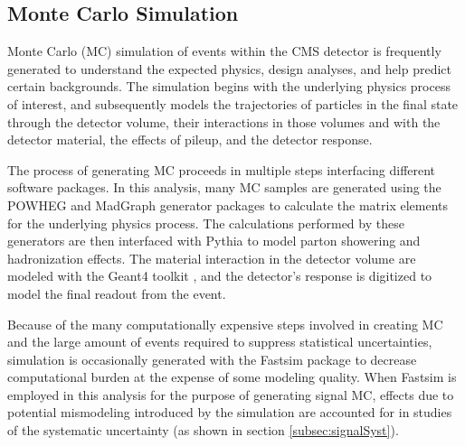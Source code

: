 \subsection{Monte Carlo Simulation}
\label{subsec:simulation}

Monte Carlo (MC) simulation of events within the CMS detector is frequently generated to understand the expected physics, design analyses, and help predict certain backgrounds. The simulation begins with the underlying physics process of interest, and subsequently models the trajectories of particles in the final state through the detector volume, their interactions in those volumes and with the detector material, the effects of pileup, and the detector response.

The process of generating MC proceeds in multiple steps interfacing different software packages. In this analysis, many MC samples are generated using the POWHEG \cite{Oleari:2010nx} and MadGraph \cite{Alwall:2011uj} generator packages to calculate the matrix elements for the underlying physics process. The calculations performed by these generators are then interfaced with Pythia \cite{Sjostrand:2007gs} to model parton showering and hadronization effects. The material interaction in the detector volume are modeled with the Geant4 toolkit \cite{Agostinelli:2002hh}, and the detector's response is digitized to model the final readout from the event.

Because of the many computationally expensive steps involved in creating MC and the large amount of events required to suppress statistical uncertainties, simulation is occasionally generated with the Fastsim package \cite{1742-6596-331-3-032049} to decrease computational burden at the expense of some modeling quality. When Fastsim is employed in this analysis for the purpose of generating signal MC, effects due to potential mismodeling introduced by the simulation are accounted for in studies of the systematic uncertainty (as shown in section \ref{subsec:signalSyst}).
 
